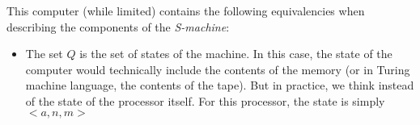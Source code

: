 \begin{aside}
    This computer (while limited) contains the following equivalencies when describing
    the components of the \emph{S-machine}:
    \begin{itemize}
        \item The set $Q$ is the set of states of the machine.  In this case, the state of the computer
        would technically include the contents of the memory (or in Turing machine language, the contents
        of the tape).  But in practice, we think instead of the state of the processor itself.  For this
        processor, the state is simply $<a, n, m>$
    \end{itemize}
\end{aside}

\fi